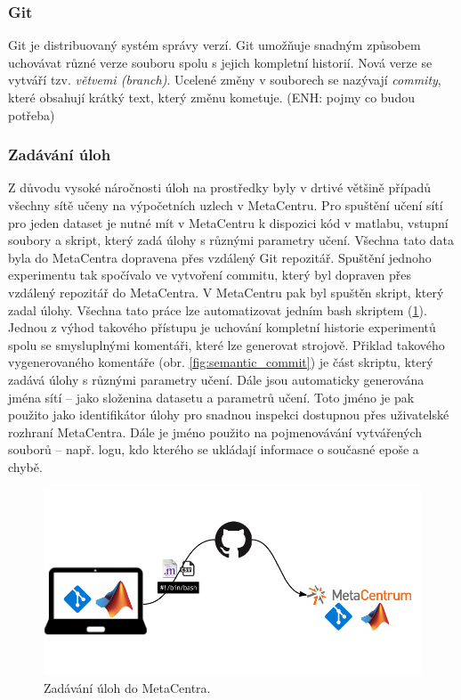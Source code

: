 \documentclass[thesis=M,czech]{FITthesis}[2012/06/26]
\begin{document}
\subsubsection*{Git}
Git je distribuovaný systém správy verzí. Git umožňuje snadným způsobem uchovávat různé verze souboru spolu s jejich kompletní historií. Nová verze se vytváří tzv. \textit{větvemi (branch)}. Ucelené změny v souborech se nazývají \textit{commity}, které  obsahují krátký text, který změnu kometuje. (ENH: pojmy co budou potřeba)


\subsubsection*{Zadávání úloh}
Z důvodu vysoké náročnosti úloh na prostředky byly v drtivé většině případů všechny sítě učeny na výpočetních uzlech v MetaCentru. Pro spuštění učení sítí pro jeden dataset je nutné mít v MetaCentru k dispozici kód v matlabu, vstupní soubory a skript, který zadá úlohy s různými parametry učení. Všechna tato data byla do MetaCentra dopravena přes vzdálený Git repozitář. Spuštění jednoho experimentu tak spočívalo ve vytvoření commitu, který byl dopraven přes vzdálený repozitář do MetaCentra. V MetaCentru pak byl spuštěn skript, který zadal úlohy. Všechna tato práce lze automatizovat jedním bash skriptem (\ref{fig:up}). 
Jednou z výhod takového přístupu je uchování kompletní historie experimentů spolu se smysluplnými komentáři, které lze generovat strojově. Přiklad takového vygenerovaného komentáře (obr. \ref{fig:semantic_commit}) je část skriptu, který zadává úlohy s různými parametry učení. Dále jsou automaticky generována jména sítí -- jako složenina datasetu a parametrů učení. Toto jméno je pak použito jako identifikátor úlohy pro snadnou inspekci dostupnou přes uživatelské rozhraní MetaCentra. Dále je jméno použito na pojmenovávání vytvářených souborů -- např. logu, kdo kterého se ukládají informace o současné epoše a chybě.

\begin{figure}[htbp]
\begin{center}
	\includegraphics[scale=0.9]{up.png}
\caption{Zadávání úloh do MetaCentra.}
\label{fig:up}
\end{center}
\end{figure}
\end{document}
